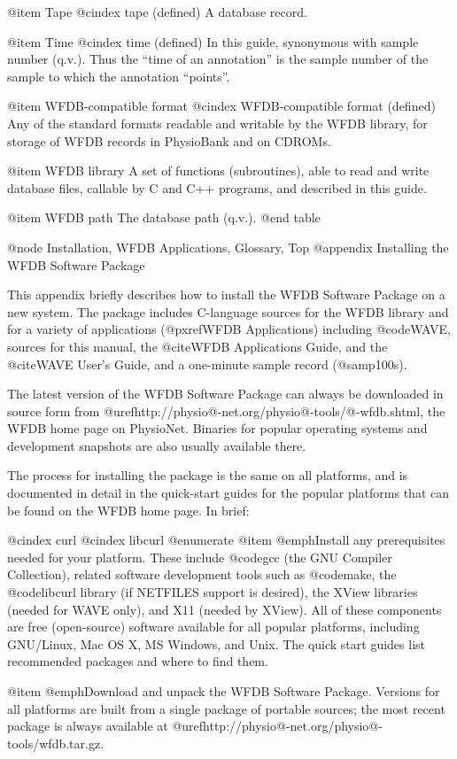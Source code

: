 {{{{{{{{@item Tape
@cindex tape (defined)
A database record.

@item Time
@cindex time (defined)
In this guide, synonymous with sample number (q.v.).  Thus the ``time of
an annotation'' is the sample number of the sample to which the
annotation ``points''.

@item WFDB-compatible format
@cindex WFDB-compatible format (defined)
Any of the standard formats readable and writable by the WFDB library,
for storage of WFDB records in PhysioBank and on CDROMs.

@item WFDB library
A set of functions (subroutines), able to read and write database files,
callable by C and C++ programs, and described in this guide.

@item WFDB path
The database path (q.v.).
@end table

@node     Installation, WFDB Applications, Glossary, Top
@appendix Installing the WFDB Software Package

This appendix briefly describes how to install the WFDB Software Package
on a new system.  The package includes C-language sources for the WFDB
library and for a variety of applications (@pxref{WFDB Applications}) including
@code{WAVE}, sources for this manual, the @cite{WFDB Applications Guide}, and
the @cite{WAVE User's Guide}, and a one-minute sample record (@samp{100s}).

The latest version of the WFDB Software Package can always be downloaded in
source form from @uref{http://physio@-net.org/physio@-tools/@-wfdb.shtml},
the WFDB home page on PhysioNet.  Binaries for popular operating systems and
development snapshots are also usually available there.

The process for installing the package is the same on all platforms, and
is documented in detail in the quick-start guides for the popular platforms
that can be found on the WFDB home page.  In brief:

@cindex curl
@cindex libcurl
@enumerate
@item
@emph{Install any prerequisites needed for your platform.}  These include
@code{gcc} (the GNU Compiler Collection), related software development tools
such as @code{make}, the @code{libcurl} library (if NETFILES support is
desired), the XView libraries (needed for WAVE only), and X11 (needed by
XView). All of these components are free (open-source) software available for
all popular platforms, including GNU/Linux, Mac OS X, MS Windows, and Unix.  The
quick start guides list recommended packages and where to find them.

@item
@emph{Download and unpack the WFDB Software Package.}  Versions for all
platforms are built from a single package of portable sources;  the most
recent package is always available at
@uref{http://physio@-net.org/physio@-tools/wfdb.tar.gz}.

}}}}}}}}

